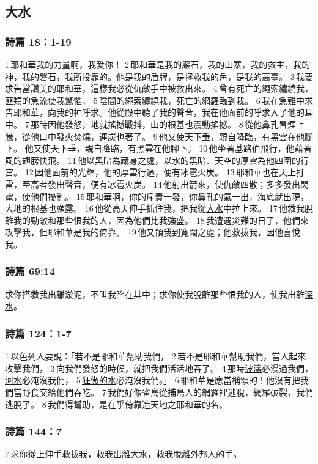 \subsection{大水}

\subsubsection{詩篇 18：1-19}
1 耶和華我的力量啊，我愛你！
2 耶和華是我的巖石，我的山寨，我的救主，我的神，我的磐石，我所投靠的。他是我的盾牌，是拯救我的角，是我的高臺。
3 我要求告當讚美的耶和華，這樣我必從仇敵手中被救出來。
4 曾有死亡的繩索纏繞我，匪類的\underline{急流}使我驚懼，
5 陰間的繩索纏繞我，死亡的網羅臨到我。
6 我在急難中求告耶和華，向我的神呼求。他從殿中聽了我的聲音，我在他面前的呼求入了他的耳中。
7 那時因他發怒，地就搖撼戰抖，山的根基也震動搖撼。
8 從他鼻孔冒煙上騰，從他口中發火焚燒，連炭也著了。
9 他又使天下垂，親自降臨，有黑雲在他腳下。
他又使天下垂，親自降臨，有黑雲在他腳下。
10 他坐著基路伯飛行，他藉著風的翅膀快飛。
11 他以黑暗為藏身之處，以水的黑暗、天空的厚雲為他四圍的行宮。
12 因他面前的光輝，他的厚雲行過，便有冰雹火炭。
13 耶和華也在天上打雷，至高者發出聲音，便有冰雹火炭。
14 他射出箭來，使仇敵四散；多多發出閃電，使他們擾亂。
15 耶和華啊，你的斥責一發，你鼻孔的氣一出，海底就出現，大地的根基也顯露。
16 他從高天伸手抓住我，把我從\underline{大水}中拉上來。
17 他救我脫離我的勁敵和那些恨我的人，因為他們比我強盛。
18 我遭遇災難的日子，他們來攻擊我，但耶和華是我的倚靠。
19 他又領我到寬闊之處；他救拔我，因他喜悅我。


\subsubsection{詩篇 69:14}
求你搭救我出離淤泥，不叫我陷在其中；求你使我脫離那些恨我的人，使我出離\underline{深水}。

\subsubsection{詩篇 124：1-7}
1 以色列人要說：「若不是耶和華幫助我們，
2 若不是耶和華幫助我們，當人起來攻擊我們，
3 向我們發怒的時候，就把我們活活地吞了。
4 那時\underline{波濤}必漫過我們，\underline{河水}必淹沒我們，
5 \underline{狂傲的水}必淹沒我們。」
6 耶和華是應當稱頌的！他沒有把我們當野食交給他們吞吃。
7 我們好像雀鳥從捕鳥人的網羅裡逃脫，網羅破裂，我們逃脫了。
8 我們得幫助，是在乎倚靠造天地之耶和華的名。

\subsubsection{詩篇 144：7}
7 求你從上伸手救拔我，救我出離\underline{大水}，救我脫離外邦人的手。

